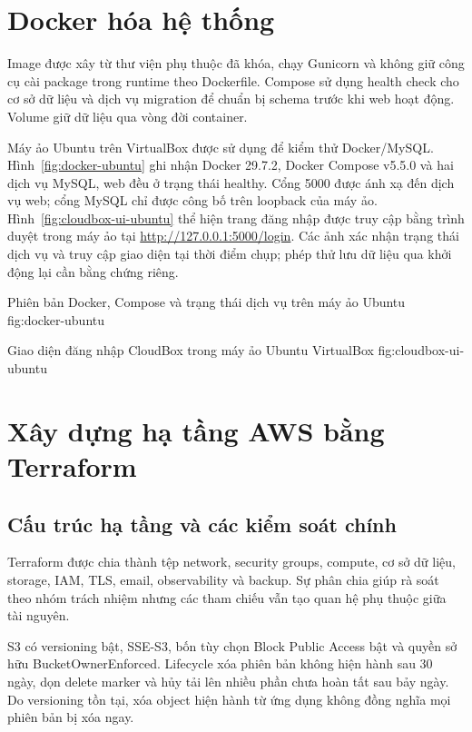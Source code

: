 \section{Docker hóa hệ thống}
Image được xây từ thư viện phụ thuộc đã khóa, chạy Gunicorn và không giữ công cụ cài package trong runtime theo Dockerfile. Compose sử dụng health check cho cơ sở dữ liệu và dịch vụ migration để chuẩn bị schema trước khi web hoạt động. Volume giữ dữ liệu qua vòng đời container.

Máy ảo Ubuntu trên VirtualBox được sử dụng để kiểm thử Docker/MySQL. Hình~\ref{fig:docker-ubuntu} ghi nhận Docker 29.7.2, Docker Compose v5.5.0 và hai dịch vụ MySQL, web đều ở trạng thái healthy. Cổng 5000 được ánh xạ đến dịch vụ web; cổng MySQL chỉ được công bố trên loopback của máy ảo. Hình~\ref{fig:cloudbox-ui-ubuntu} thể hiện trang đăng nhập được truy cập bằng trình duyệt trong máy ảo tại \url{http://127.0.0.1:5000/login}. Các ảnh xác nhận trạng thái dịch vụ và truy cập giao diện tại thời điểm chụp; phép thử lưu dữ liệu qua khởi động lại cần bằng chứng riêng.

{Phiên bản Docker, Compose và trạng thái dịch vụ trên máy ảo Ubuntu}
{fig:docker-ubuntu}

{Giao diện đăng nhập CloudBox trong máy ảo Ubuntu VirtualBox}
{fig:cloudbox-ui-ubuntu}

\section{Xây dựng hạ tầng AWS bằng Terraform}
\subsection{Cấu trúc hạ tầng và các kiểm soát chính}
Terraform được chia thành tệp network, security groups, compute, cơ sở dữ liệu, storage, IAM, TLS, email, observability và backup. Sự phân chia giúp rà soát theo nhóm trách nhiệm nhưng các tham chiếu vẫn tạo quan hệ phụ thuộc giữa tài nguyên.

S3 có versioning bật, SSE-S3, bốn tùy chọn Block Public Access bật và quyền sở hữu BucketOwnerEnforced. Lifecycle xóa phiên bản không hiện hành sau 30 ngày, dọn delete marker và hủy tải lên nhiều phần chưa hoàn tất sau bảy ngày. Do versioning tồn tại, xóa object hiện hành từ ứng dụng không đồng nghĩa mọi phiên bản bị xóa ngay.

